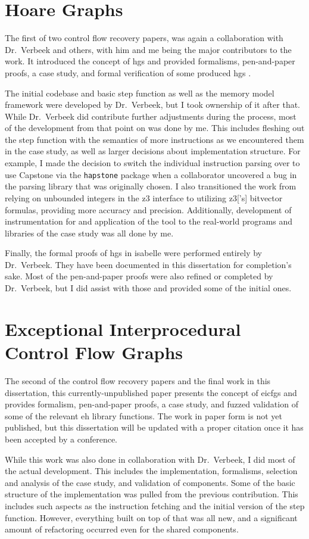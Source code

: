 \section*{Hoare Graphs}
The first of two control flow recovery papers,  was again a collaboration with Dr.~Verbeek and others, with him and me being the major contributors to the work.
It introduced the concept of \acp{hg} and provided formalisms, pen-and-paper proofs, a case study, and formal verification of some produced \acp{hg} \autocite{verbeek2022lifting}.

The initial codebase and basic step function as well as the memory model framework were developed by Dr.~Verbeek, but I took ownership of it after that.
While Dr.~Verbeek did contribute further adjustments during the process, most of the development from that point on was done by me.
This includes fleshing out the step function with the semantics of more instructions as we encountered them in the case study, as well as larger decisions about implementation structure.
For example, I made the decision to switch the individual instruction parsing over to use Capstone \autocite{capstone} via the \texttt{hapstone} package \autocite{hapstone} when a collaborator uncovered a bug in the parsing library that was originally chosen.
I also transitioned the work from relying on unbounded integers in the \gls{z3} interface to utilizing \gls{z3}['s] bitvector formulas, providing more accuracy and precision.
Additionally, development of instrumentation for and application of the tool to the real-world programs and libraries of the case study was all done by me.

Finally, the formal proofs of \acp{hg} in \gls{isabelle} were performed entirely by Dr.~Verbeek.
They have been documented in this dissertation for completion's sake.
Most of the pen-and-paper proofs were also refined or completed by Dr.~Verbeek, but I did assist with those and provided some of the initial ones.

\section*{Exceptional Interprocedural Control Flow Graphs}
The second of the control flow recovery papers and the final work in this dissertation, this currently-unpublished paper presents the concept of \acp{eicfg} and provides formalism, pen-and-paper proofs, a case study, and fuzzed validation of some of the relevant \ac{eh} library functions.
The work in paper form is not yet published, but this dissertation will be updated with a proper citation once it has been accepted by a conference.

While this work was also done in collaboration with Dr.~Verbeek, I did most of the actual development.
This includes the implementation, formalisms, selection and analysis of the case study, and validation of components.
Some of the basic structure of the implementation was pulled from the previous contribution.
This includes such aspects as the instruction fetching and the initial version of the step function.
However, everything built on top of that was all new, and a significant amount of refactoring occurred even for the shared components.
